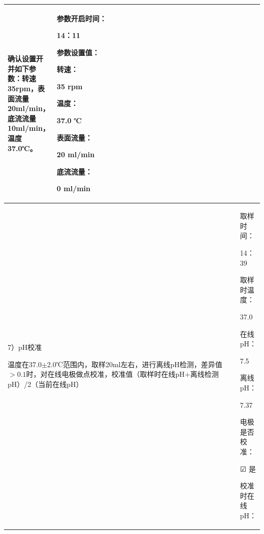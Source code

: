 \documentclass[UTF8,10pt,a4paper,fontset=fandol]{ctexart}
\newcommand{\fieldvalue}[1]{#1}
\newcommand{\handwritten}[1]{#1}
\newcommand{\checkboxfield}[1]{\ifstrequal{#1}{checked}{☑}{\ifstrequal{#1}{unclear}{?}{☐}}}
\begin{document}
\begin{tabular}{|p{0.16\linewidth}|p{0.36\linewidth}|p{0.22\linewidth}|p{0.18\linewidth}|p{0.12\linewidth}|}
{确认设置开并如下参数：转速35rpm，表面流量20ml/min，底流流量10ml/min，温度37.0℃。
}
&
\begin{minipage}[t]{0.18\linewidth}
参数开启时间：

\fieldvalue{\handwritten{14：11}}

参数设置值：

转速：

\fieldvalue{\handwritten{35}} rpm

温度：

\fieldvalue{\handwritten{37.0}} ℃

表面流量：

\fieldvalue{\handwritten{20}} ml/min

底流流量：

\fieldvalue{\handwritten{0}} ml/min
\end{minipage}
\\
\hline
\multicolumn{4}{|p{0.74\linewidth}|}{
7）pH校准

温度在37.0$\pm$2.0℃范围内，取样20ml左右，进行离线pH检测，差异值$>0.1$时，对在线电极做点校准，校准值（取样时在线pH+离线检测pH）/2（当前在线pH）
}
&
\begin{minipage}[t]{0.18\linewidth}
取样时间：

\fieldvalue{\handwritten{14：39}}

取样时温度：

\fieldvalue{\handwritten{37.0}}

在线pH：

\fieldvalue{\handwritten{7.5}}

离线pH：

\fieldvalue{\handwritten{7.37}}

电极是否校准：

\fieldvalue{\checkboxfield{checked}} 是

校准时在线pH：


\end{minipage}
\end{tabular}
\end{document}
